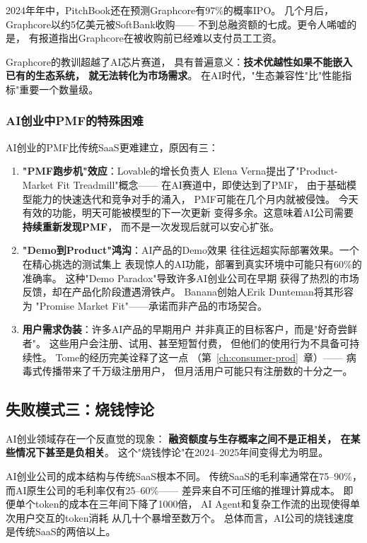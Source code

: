2024年年中，PitchBook还在预测Graphcore有97\%的概率IPO。
几个月后，Graphcore以约5亿美元被SoftBank收购——
不到总融资额的七成。更令人唏嘘的是，
有报道指出Graphcore在被收购前已经难以支付员工工资。

Graphcore的教训超越了AI芯片赛道，
具有普遍意义：\textbf{技术优越性如果不能嵌入已有的生态系统，
就无法转化为市场需求}。
在AI时代，"生态兼容性"比"性能指标"重要一个数量级。

\subsubsection{AI创业中PMF的特殊困难}
AI创业的PMF比传统SaaS更难建立，原因有三：

\begin{enumerate}
  \item \textbf{"PMF跑步机"效应}：Lovable的增长负责人
    Elena Verna提出了"Product-Market Fit Treadmill"概念——
    在AI赛道中，即使达到了PMF，
    由于基础模型能力的快速迭代和竞争对手的涌入，
    PMF可能在几个月内就被侵蚀。
    今天有效的功能，明天可能被模型的下一次更新
    变得多余。这意味着AI公司需要\textbf{持续重新发现PMF}，
    而不是一次发现后就可以安心扩张。

  \item \textbf{"Demo到Product"鸿沟}：AI产品的Demo效果
    往往远超实际部署效果。一个在精心挑选的测试集上
    表现惊人的AI功能，部署到真实环境中可能只有60\%的准确率。
    这种"Demo Paradox"导致许多AI创业公司在早期
    获得了热烈的市场反馈，却在产品化阶段遭遇滑铁卢。
    Banana创始人Erik Dunteman将其形容为
    "Promise Market Fit"——承诺而非产品的市场契合。

  \item \textbf{用户需求伪装}：许多AI产品的早期用户
    并非真正的目标客户，而是"好奇尝鲜者"。
    这些用户会注册、试用、甚至短暂付费，
    但他们的使用行为不具备可持续性。
    Tome的经历完美诠释了这一点
    （第~\ref{ch:consumer-prod}~章）——
    病毒式传播带来了千万级注册用户，
    但月活用户可能只有注册数的十分之一。
\end{enumerate}


\subsection{失败模式三：烧钱悖论}

AI创业领域存在一个反直觉的现象：
\textbf{融资额度与生存概率之间不是正相关，
在某些情况下甚至是负相关}。
这个"烧钱悖论"在2024--2025年间变得尤为明显。

AI创业公司的成本结构与传统SaaS根本不同。
传统SaaS的毛利率通常在75--90\%，
而AI原生公司的毛利率仅有25--60\%——
差异来自不可压缩的推理计算成本。
即便单个token的成本在三年间下降了1000倍，
AI Agent和复杂工作流的出现使得单次用户交互的token消耗
从几十个暴增至数万个。
总体而言，AI公司的烧钱速度是传统SaaS的两倍以上。

